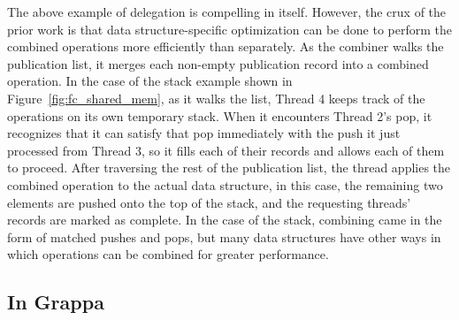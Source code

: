 The above example of delegation is compelling in itself. However, the crux of the prior work is that data structure-specific optimization can be done to perform the combined operations more efficiently than separately.
As the combiner walks the publication list, it merges each non-empty publication record into a combined operation. In the case of the stack example shown in Figure~\ref{fig:fc_shared_mem}, as it walks the list, Thread 4 keeps track of the operations on its own temporary stack. When it encounters Thread 2's pop, it recognizes that it can satisfy that pop immediately with the push it just processed from Thread 3, so it fills each of their records and allows each of them to proceed. After traversing the rest of the publication list, the thread applies the combined operation to the actual data structure, in this case, the remaining two elements are pushed onto the top of the stack, and the requesting threads' records are marked as complete.
In the case of the stack, combining came in the form of matched pushes and pops, but many data structures have other ways in which operations can be combined for greater performance.

\subsection{In Grappa}

